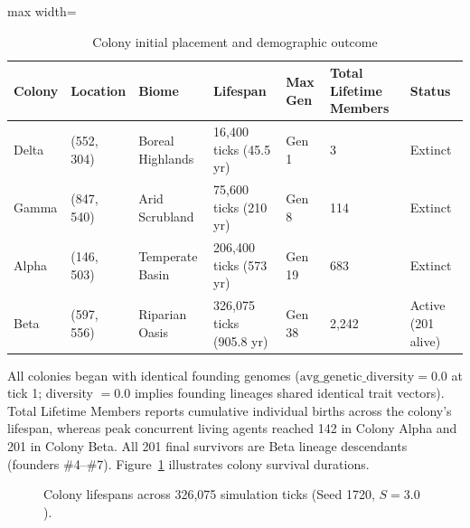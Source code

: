 \documentclass[12pt,a4paper]{article}
\begin{document}
\begin{table}[h]
\centering
\caption{Colony initial placement and demographic outcome}
\label{tab:survival}
\begin{adjustbox}{max width=\linewidth}
\begin{tabular}{lllllll}
\toprule
\textbf{Colony} & \textbf{Location} & \textbf{Biome} & \textbf{Lifespan} & \textbf{Max Gen} & \textbf{Total Lifetime Members} & \textbf{Status} \\
\midrule
Delta & (552, 304) & Boreal Highlands & 16,400 ticks (45.5 yr) & Gen 1 & 3 & Extinct \\
Gamma & (847, 540) & Arid Scrubland & 75,600 ticks (210 yr) & Gen 8 & 114 & Extinct \\
Alpha & (146, 503) & Temperate Basin & 206,400 ticks (573 yr) & Gen 19 & 683 & Extinct \\
Beta & (597, 556) & Riparian Oasis & 326,075 ticks (905.8 yr) & Gen 38 & 2,242 & Active (201 alive) \\
\bottomrule
\end{tabular}
\end{adjustbox}
\end{table}

All colonies began with identical founding genomes ($\text{avg\_genetic\_diversity} = 0.0$ at tick 1; diversity $= 0.0$ implies founding lineages shared identical trait vectors). Total Lifetime Members reports cumulative individual births across the colony's lifespan, whereas peak concurrent living agents reached 142 in Colony Alpha and 201 in Colony Beta. All 201 final survivors are Beta lineage descendants (founders \#4--\#7). Figure~\ref{fig:colony_timeline} illustrates colony survival durations.

\begin{figure}[ht]
\centering
{}
\caption{Colony lifespans across 326,075 simulation ticks (Seed 1720, $S{=}3.0$).}
\label{fig:colony_timeline}
\end{figure}
\end{document}
